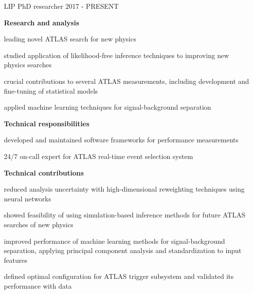 

\begin{cventries}

    \cventry
    {LIP}
    {PhD researcher}
    {}
    {2017 - PRESENT}
    {
        \textbf{Research and analysis}\vspace{12pt}
        \begin{cvitems}      
            \item {leading novel ATLAS search for new physics}
            \item {studied application of likelihood-free inference techniques to improving new physics searches}
            \item {crucial contributions to several ATLAS measurements, including development and fine-tuning of statistical models}
            \item {applied machine learning techniques for signal-background separation}
        \end{cvitems}\vspace{19pt}
        \textbf{Technical responsibilities}\vspace{12pt}
        \begin{cvitems}
            \item {developed and maintained software frameworks for performance measurements}
            \item {24/7 on-call expert for ATLAS real-time event selection system}
        \end{cvitems}\vspace{19pt}
        \textbf{Technical contributions}\vspace{12pt}
        \begin{cvitems}
            \item {reduced analysis uncertainty with high-dimensional reweighting techniques using neural networks}
            \item {showed feasibility of using simulation-based inference methods for future ATLAS searches of new physics}
            \item {improved performance of machine learning methods for signal-background separation, applying principal component analysis and standardization to input features}
            \item {defined optimal configuration for ATLAS trigger subsystem and validated its performance with data}
        \end{cvitems}
    }

\end{cventries}